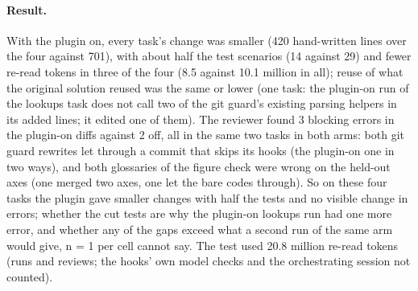 \documentclass[11pt]{article}
\begin{document}
\paragraph{Result.} With the plugin on, every task's change was smaller (420 hand-written lines over the four against
701), with about half the test scenarios (14 against 29) and fewer re-read tokens in three of the four (8.5 against 10.1
million in all); reuse of what the original solution reused was the same or lower (one task: the plugin-on run of the
lookups task does not call two of the git guard's existing parsing helpers in its added lines; it edited one of them).
The reviewer found 3
blocking errors in the plugin-on diffs against 2 off, all in the same two tasks in both arms: both git guard rewrites
let through a commit that skips its hooks (the plugin-on one in two ways), and both glossaries of the figure check
were wrong on the held-out axes (one merged two axes, one let the bare codes through). So on these four tasks the plugin
gave smaller changes with half the tests and no visible change in errors; whether the cut tests are why
the plugin-on lookups run had one more error, and whether any of the gaps exceed what a second run of the same arm would
give, n = 1 per cell cannot say. The test used 20.8 million re-read tokens (runs and reviews; the hooks' own model
checks and the orchestrating session not counted).

\end{document}
